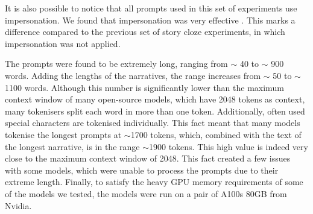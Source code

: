 It is also possible to notice that all prompts used in this set of experiments use impersonation. We found that impersonation was very effective \cite{impersonation}. This marks a difference compared to the previous set of story cloze experiments, in which impersonation was not applied.

The prompts were found to be extremely long, ranging from $\sim$ 40  to $\sim$ 900 words. Adding the lengths of the narratives, the range increases from $\sim$ 50 to $\sim$ 1100 words. Although this number is significantly lower than the maximum context window of many open-source models, which have 2048 tokens as context, many tokenisers split each word in more than one token. Additionally, often used special characters are tokenised individually. This fact meant that many models tokenise the longest prompts at $\sim$1700 tokens, which, combined with the text of the longest narrative, is in the range $\sim$1900 tokens. This high value is indeed very close to the maximum context window of 2048. This fact created a few issues with some models, which were unable to process the prompts due to their extreme length. 
Finally, to satisfy the heavy GPU memory requirements of some of the models we tested, the models were run on a pair of A100s 80GB from Nvidia. 

